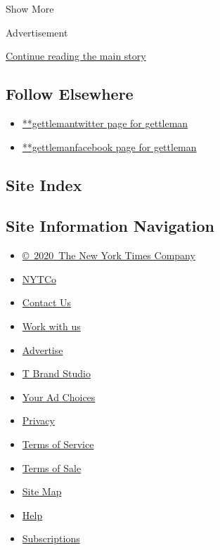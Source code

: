 Show More

Advertisement

\protect\hyperlink{after-mid2}{Continue reading the main story}

\hypertarget{follow-elsewhere}{%
\subsection{Follow Elsewhere}\label{follow-elsewhere}}

\begin{itemize}
\tightlist
\item
  \href{https://twitter.com/gettleman}{**gettlemantwitter page for
  gettleman}
\item
  \href{https://www.facebook.com/gettleman}{**gettlemanfacebook page for
  gettleman}
\end{itemize}

\hypertarget{site-index}{%
\subsection{Site Index}\label{site-index}}

\hypertarget{site-information-navigation}{%
\subsection{Site Information
Navigation}\label{site-information-navigation}}

\begin{itemize}
\tightlist
\item
  \href{https://help.nytimes.com/hc/en-us/articles/115014792127-Copyright-notice}{©~2020~The
  New York Times Company}
\end{itemize}

\begin{itemize}
\tightlist
\item
  \href{https://www.nytco.com/}{NYTCo}
\item
  \href{https://help.nytimes.com/hc/en-us/articles/115015385887-Contact-Us}{Contact
  Us}
\item
  \href{https://www.nytco.com/careers/}{Work with us}
\item
  \href{https://nytmediakit.com/}{Advertise}
\item
  \href{http://www.tbrandstudio.com/}{T Brand Studio}
\item
  \href{https://www.nytimes.com/privacy/cookie-policy\#how-do-i-manage-trackers}{Your
  Ad Choices}
\item
  \href{https://www.nytimes.com/privacy}{Privacy}
\item
  \href{https://help.nytimes.com/hc/en-us/articles/115014893428-Terms-of-service}{Terms
  of Service}
\item
  \href{https://help.nytimes.com/hc/en-us/articles/115014893968-Terms-of-sale}{Terms
  of Sale}
\item
  \href{https://spiderbites.nytimes.com}{Site Map}
\item
  \href{https://help.nytimes.com/hc/en-us}{Help}
\item
  \href{https://www.nytimes.com/subscription?campaignId=37WXW}{Subscriptions}
\end{itemize}
